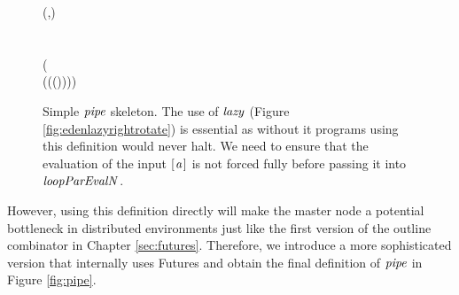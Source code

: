 \documentclass[paper=A4,twoside=true,openright,parskip=full,chapterprefix=true,headings=normal,bibliography=totoc,listof=totoc,titlepage=on,captions=tableabove,draft=false,british]{scrreprt}%
\begin{document}
\begin{figure}[t]
\centering
\begin{hscode}\SaveRestoreHook
{}%
%
%
%
\>[B]{}\mathbin{::}(\;,\;\;\;\;)\Rightarrow {}\<[E]%
\\
\>[B]{}\<[5]%
\>[5]{}\to {}\;\;\<[E]%
\\
\>[B]{}\;\;\mathrel{=}{}\<[E]%
\\
\>[B]{}\<[5]%
\>[5]{}\;(\;\mathbin{\&\!\&\!\&}{}\<[E]%
\\
\>[5]{}\<[9]%
\>[9]{}(\;(\;(\mathbin{:})\mathbin{>\!\!>\!\!>})\mathbin{>\!\!>\!\!>}\;\;))\mathbin{>\!\!>\!\!>}{}\<[E]%
\\
\>[B]{}\<[5]%
\>[5]{}\;\<[E]%
\ColumnHook
\end{hscode}\resethooks
\caption[Simple \ensuremath{\Varid{pipe}} skeleton.]{Simple \ensuremath{\Varid{pipe}} skeleton. The use of \ensuremath{\Varid{lazy}} (Figure \ref{fig:edenlazyrightrotate}) is essential as without it programs using this definition would never halt. We need to ensure that the evaluation of the input \ensuremath{[\mskip1.5mu \Varid{a}\mskip1.5mu]} is not forced fully before passing it into \ensuremath{\Varid{loopParEvalN}}.}\label{fig:pipeSimple}\end{figure}

However, using this definition directly will make the master node a
potential bottleneck in distributed environments just like the first
version of the outline combinator in Chapter \ref{sec:futures}.
Therefore, we introduce a more sophisticated version that internally
uses Futures and obtain the final definition of \ensuremath{\Varid{pipe}} in Figure
\ref{fig:pipe}.
\end{document}
